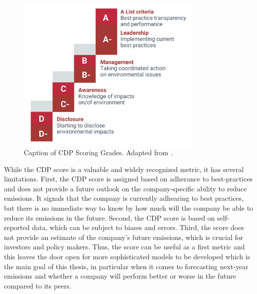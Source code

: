\begin{figure}[h]
    \centering
    \includegraphics[width=0.8\textwidth]{figures/cdp_scoring.png}
    \caption{Caption of CDP Scoring Grades. Adapted from \cite{CDP2022ScoringPDF}.}
    \label{fig:my_label}
\end{figure}


\noindent While the CDP score is a valuable and widely recognized metric, it has several limitations. First, the CDP score is assigned based on adherance to best-practices and does not provide a future outlook on the company-specific ability to reduce emissions. It signals that the company is currently adhearing to best practices, but there is no immediate way to know by how much will the company be able to reduce its emissions in the future. Second, the CDP score is based on self-reported data, which can be subject to biases and errors. Third, the score does not provide an estimate of the company's future emissions, which is crucial for investors and policy makers. Thus, the score can be useful as a first metric and this leaves the door open for more sophisticated models to be developed which is the main goal of this thesis, in particular when it comes to forecasting next-year emissions and whether a company will perform better or worse in the future compared to its peers.
